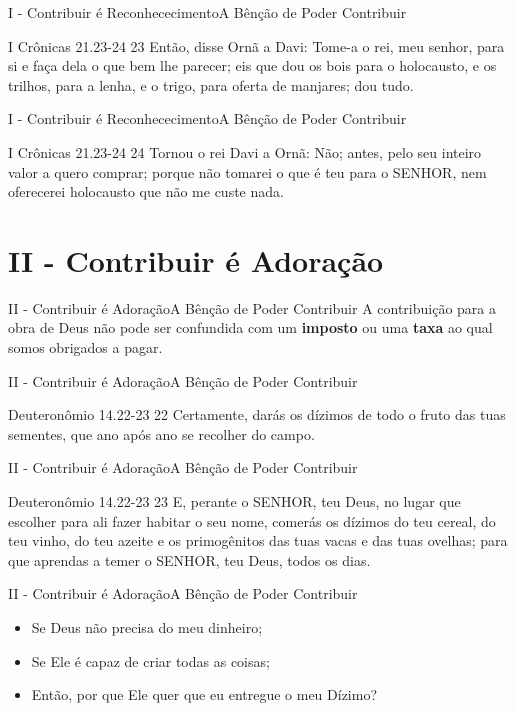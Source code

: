 \documentclass[14pt,aspectratio=169]{beamer}
\newcommand{\TT}{A Bênção de Poder Contribuir}
\newcommand{\PI}{I - Contribuir é Reconhececimento}
\newcommand{\PII}{II - Contribuir é Adoração}
\begin{document}
\begin{frame}{\PI}{\TT}
 \begin{block}{I Crônicas 21.23-24}\pause
 \Large
23 Então, disse Ornã a Davi: Tome-a o rei, meu senhor, para si e faça dela o que bem lhe parecer; eis que dou os bois para o holocausto, e os trilhos, para a lenha, e o trigo, para oferta de manjares; dou tudo.
 \end{block}
\end{frame}

\begin{frame}{\PI}{\TT}
 \begin{block}{I Crônicas 21.23-24}
24 Tornou o rei Davi a Ornã: Não; antes, pelo seu inteiro valor a quero comprar; porque não tomarei o que é teu para o SENHOR, nem oferecerei holocausto que não me custe nada.
 \end{block}
\end{frame}

\section{\PII}
 \begin{frame}{\PII}{\TT}\pause
 A contribuição para a obra de Deus não pode ser confundida com um \textbf{imposto} ou uma \textbf{taxa} ao qual somos obrigados a pagar.
 \end{frame}

\begin{frame}{\PII}{\TT}
 \begin{block}{Deuteronômio 14.22-23}
 22 Certamente, darás os dízimos de todo o fruto das tuas sementes, que ano após ano se recolher do campo.
 \end{block}
\end{frame}

\begin{frame}{\PII}{\TT}
 \begin{block}{Deuteronômio 14.22-23}
\Large 
23 E, perante o SENHOR, teu Deus, no lugar que escolher para ali fazer habitar o seu nome, comerás os dízimos do teu cereal, do teu vinho, do teu azeite e os primogênitos das tuas vacas e das tuas ovelhas; para que aprendas a temer o SENHOR, teu Deus, todos os dias.
 \end{block}
\end{frame}

\begin{frame}{\PII}{\TT}
 \begin{itemize}
  \item Se Deus não precisa do meu dinheiro;\pause
  \item Se Ele é capaz de criar todas as coisas;\pause
  \item Então, por que Ele quer que eu entregue o meu Dízimo?
 \end{itemize}
\end{frame}
\end{document}
